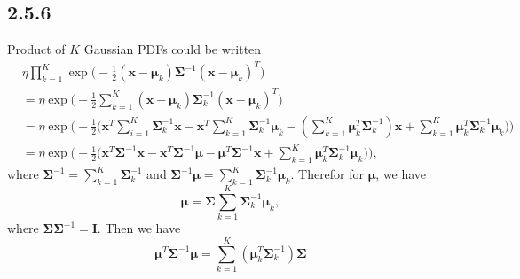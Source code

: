 \documentclass[a4paper, 11pt]{article}
\begin{document}
\subsection{2.5.6}
Product of $K$ Gaussian PDFs could be written
\begin{equation*}
    \begin{split}
      & \eta \prod_{k=1}^K\exp\Big(-\frac{1}{2}(\mathbf{x}-\boldsymbol{\mu}_k)\boldsymbol{\Sigma}^{-1}(\mathbf{x}-\boldsymbol{\mu}_k)^T\Big)\\
       &=\eta \exp\big( -\frac{1}{2}\sum_{k=1}^K(\mathbf{x}-\boldsymbol{\mu}_k)\boldsymbol{\Sigma}_k^{-1}(\mathbf{x}-\boldsymbol{\mu}_k)^T \big)\\
       &=\eta \exp\Big( -\frac{1}{2}\big(\mathbf{x}^T\sum_{i=1}^K\boldsymbol{\Sigma}_k^{-1}\mathbf{x}-\mathbf{x}^T\sum_{k=1}^K \boldsymbol{\Sigma}_k^{-1}\boldsymbol{\mu}_k-(\sum_{k=1}^K \boldsymbol{\mu}_k^T\boldsymbol{\Sigma}_k^{-1})\mathbf{x}+\sum_{k=1}^K \boldsymbol{\mu}_k^T\boldsymbol{\Sigma}_k^{-1}\boldsymbol{\mu}_k\big)\Big)\\
        &=\eta \exp\Big( -\frac{1}{2}\big(\mathbf{x}^T\boldsymbol{\Sigma}^{-1}\mathbf{x}-\mathbf{x}^T\boldsymbol{\Sigma}^{-1}\boldsymbol{\mu}-\boldsymbol{\mu}^T\boldsymbol{\Sigma}^{-1}\mathbf{x}+\sum_{k=1}^K \boldsymbol{\mu}_k^T\boldsymbol{\Sigma}_k^{-1}\boldsymbol{\mu}_k\big)\Big),
    \end{split}
\end{equation*}
where $\boldsymbol{\Sigma}^{-1} = \sum_{k=1}^K \boldsymbol{\Sigma}_k^{-1}$ and $\boldsymbol{\Sigma}^{-1}\boldsymbol{\mu} =  \sum_{k=1}^K \boldsymbol{\Sigma}_k^{-1}\boldsymbol{\mu}_k$.
Therefor for $\boldsymbol{\mu}$, we have
\begin{equation*}
   \boldsymbol{\mu} =  \boldsymbol{\Sigma} \sum_{k=1}^K \boldsymbol{\Sigma}_k^{-1}\boldsymbol{\mu}_k,
\end{equation*}
where $ \boldsymbol{\Sigma}\boldsymbol{\Sigma}^{-1} = \mathbf{I}$. Then we have
\begin{equation*}
     \boldsymbol{\mu}^T\boldsymbol{\Sigma}^{-1}\boldsymbol{\mu} =  \sum_{k=1}^K(\boldsymbol{\mu}_k^T \boldsymbol{\Sigma}_k^{-1})\boldsymbol{\Sigma}
\end{equation*}
\end{document}
